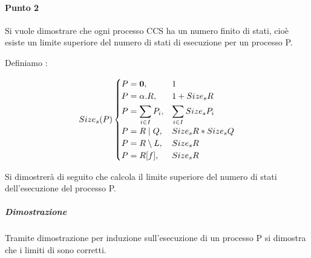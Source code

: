 \paragraph{Punto 2} \mbox{}

Si vuole dimostrare che ogni processo CCS ha un numero finito di stati, cioè esiste un limite superiore del numero di stati di esecuzione per un processo P.

Definiamo :

\[
Size_{s}(P)
\begin{cases}
P=\mathbf{0}, 			& 1							\\
P=\alpha.R,     & 1+Size_{s}{R}                \\
P=\displaystyle\sum_{i\in I}^{}P_{i},          & \displaystyle\sum_{i\in I}^{}Size_{s}{P_{i}} \\
P=R\mid Q,      & Size_{s}{R}*Size_{s}{Q}       \\
P=R\setminus L, & Size_{s}{R}                  \\
P=R[f],         & Size_{s}{R}
\end{cases}
\]

Si dimostrerà di seguito che  calcola il limite superiore del numero di stati dell'esecuzione del processo P.

\subparagraph{Dimostrazione} \mbox{}

Tramite dimostrazione per induzione sull'esecuzione di un processo P si dimostra che i limiti di  sono corretti.

